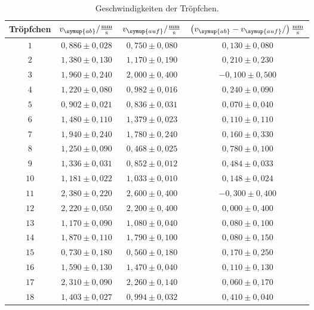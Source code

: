 \begin{table}
  \centering
  \caption{Geschwindigkeiten der Tröpfchen.}
  \label{tab:Geschwindigkeit}
  \begin{tabular}{c | c c c}
    \toprule
    Tröpfchen & $v_{\symup{ab}}/\frac{\si{\milli\meter}}{\si{\second}}$ & $v_{\symup{auf}}/\frac{\si{\milli\meter}}{\si{\second}}$ &
    $\left(v_{\symup{ab}} - v_{\symup{auf}}/\right)\frac{\si{\milli\meter}}{\si{\second}}$ \\
    \midrule
    $  1 $ & $ 0,886 \pm 0,028 $ & $ 0,750 \pm 0,080 $ & $ 0,130 \pm 0,080 $ \\
    $  2 $ & $ 1,380 \pm 0,130 $ & $ 1,170 \pm 0,190 $ & $ 0,210 \pm 0,230 $ \\
    $  3 $ & $ 1,960 \pm 0,240 $ & $ 2,000 \pm 0,400 $ & $-0,100 \pm 0,500 $ \\
    $  4 $ & $ 1,220 \pm 0,080 $ & $ 0,982 \pm 0,016 $ & $ 0,240 \pm 0,090 $ \\
    $  5 $ & $ 0,902 \pm 0,021 $ & $ 0,836 \pm 0,031 $ & $ 0,070 \pm 0,040 $ \\
    $  6 $ & $ 1,480 \pm 0,110 $ & $ 1,379 \pm 0,023 $ & $ 0,110 \pm 0,110 $  \\
    $  7 $ & $ 1,940 \pm 0,240 $ & $ 1,780 \pm 0,240 $ & $ 0,160 \pm 0,330 $  \\
    $  8 $ & $ 1,250 \pm 0,090 $ & $ 0,468 \pm 0,025 $ & $ 0,780 \pm 0,100 $  \\
    $  9 $ & $ 1,336 \pm 0,031 $ & $ 0,852 \pm 0,012 $ & $ 0,484 \pm 0,033 $  \\
    $ 10 $ & $ 1,181 \pm 0,022 $ & $ 1,033 \pm 0,010 $ & $ 0,148 \pm 0,024 $  \\
    $ 11 $ & $ 2,380 \pm 0,220 $ & $ 2,600 \pm 0,400 $ & $-0,300 \pm 0,400 $ \\
    $ 12 $ & $ 2,220 \pm 0,050 $ & $ 2,200 \pm 0,400 $ & $ 0,000 \pm 0,400 $ \\
    $ 13 $ & $ 1,170 \pm 0,090 $ & $ 1,080 \pm 0,040 $ & $ 0,080 \pm 0,100 $ \\
    $ 14 $ & $ 1,870 \pm 0,110 $ & $ 1,790 \pm 0,100 $ & $ 0,080 \pm 0,150 $ \\
    $ 15 $ & $ 0,730 \pm 0,180 $ & $ 0,560 \pm 0,180 $ & $ 0,170 \pm 0,250 $ \\
    $ 16 $ & $ 1,590 \pm 0,130 $ & $ 1,470 \pm 0,040 $ & $ 0,110 \pm 0,130 $ \\
    $ 17 $ & $ 2,310 \pm 0,090 $ & $ 2,260 \pm 0,140 $ & $ 0,060 \pm 0,170 $ \\
    $ 18 $ & $ 1,403 \pm 0,027 $ & $ 0,994 \pm 0,032 $ & $ 0,410 \pm 0,040 $ \\

\end{tabular}
\end{table}
